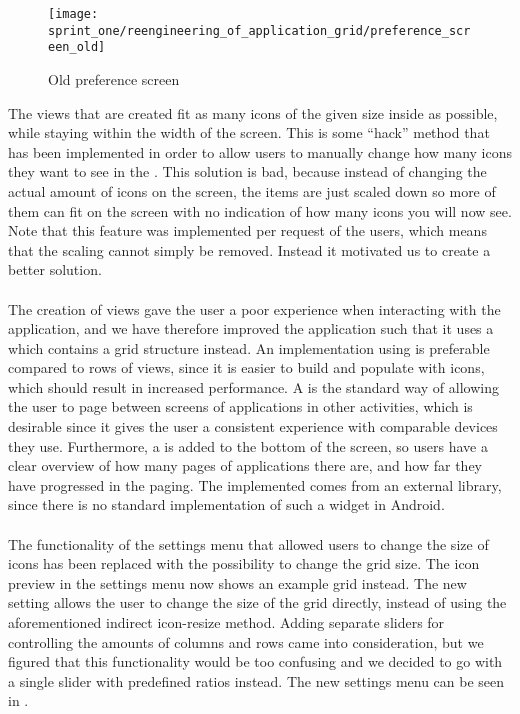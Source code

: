 \begin{figure}[!htbp]
    \centering
    \texttt{[image: sprint\_one/reengineering\_of\_application\_grid/preference\_screen\_old]}
    \caption{Old preference screen}
    \label{fig:preference_screen_old}
\end{figure}

The  views that are created fit as many icons of the given size inside as possible, while staying within the width of the screen. This is some ``hack'' method that has been implemented in order to allow users to manually change how many icons they want to see in the \launcher. This solution is bad, because instead of changing the actual amount of icons on the screen, the items are just scaled down so more of them can fit on the screen with no indication of how many icons you will now see. Note that this feature was implemented per request of the users, which means that the scaling cannot simply be removed. Instead it motivated us to create a better solution.
\\\\
The creation of  views gave the user a poor experience when interacting with the application, and we have therefore improved the \launcher application such that it uses a  which contains a grid structure instead. An implementation using  is preferable compared to rows of  views, since it is easier to build and populate with icons, which should result in increased performance. A  is the standard way of allowing the user to page between screens of applications in other \launcher activities, which is desirable since it gives the user a consistent experience with comparable devices they use. Furthermore, a  is added to the bottom of the screen, so users have a clear overview of how many pages of applications there are, and how far they have progressed in the paging. The implemented  comes from an external library\parencite{view_pager_indicator_avianey}, since there is no standard implementation of such a widget in Android.
\\\\
The functionality of the settings menu that allowed users to change the size of icons has been replaced with the possibility to change the \launcher grid size. The icon preview in the settings menu now shows an example grid instead. The new setting allows the user to change the size of the grid directly, instead of using the aforementioned indirect icon-resize method. Adding separate sliders for controlling the amounts of columns and rows came into consideration, but we figured that this functionality would be too confusing and we decided to go with a single slider with predefined ratios instead. The new settings menu can be seen in . 

